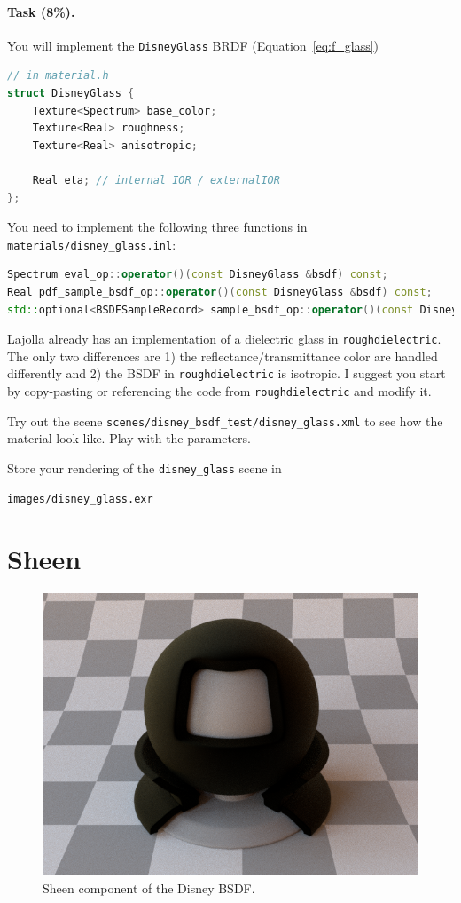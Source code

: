\paragraph{Task (8\%).} You will implement the \lstinline{DisneyGlass} BRDF (Equation~\ref{eq:f_glass})
\begin{lstlisting}[language=c++]
// in material.h
struct DisneyGlass {
    Texture<Spectrum> base_color;
    Texture<Real> roughness;
    Texture<Real> anisotropic;

    Real eta; // internal IOR / externalIOR
};
\end{lstlisting}

You need to implement the following three functions in \lstinline{materials/disney_glass.inl}:
\begin{lstlisting}[language=c++]
Spectrum eval_op::operator()(const DisneyGlass &bsdf) const;
Real pdf_sample_bsdf_op::operator()(const DisneyGlass &bsdf) const;
std::optional<BSDFSampleRecord> sample_bsdf_op::operator()(const DisneyGlass &bsdf) const;
\end{lstlisting}

Lajolla already has an implementation of a dielectric glass in \lstinline{roughdielectric}. The only two differences are 1) the reflectance/transmittance color are handled differently and 2) the BSDF in \lstinline{roughdielectric} is isotropic. I suggest you start by copy-pasting or referencing the code from \lstinline{roughdielectric} and modify it.

Try out the scene \lstinline{scenes/disney_bsdf_test/disney_glass.xml} to see how the material look like. Play with the parameters.

Store your rendering of the \lstinline{disney_glass} scene in
\begin{lstlisting}
images/disney_glass.exr
\end{lstlisting}

\section{Sheen}
\begin{figure}
	\centering
	\includegraphics[width=0.5\linewidth]{imgs/disney_sheen.png}
	\caption{Sheen component of the Disney BSDF.}
\end{figure}

